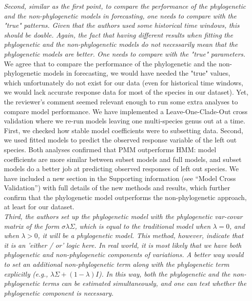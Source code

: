 \documentclass[11pt]{article}
\begin{document}
\emph{Second, similar as the first point, to compare the performance of the phylogenetic and the non-phylogenetic models in forecasting, one needs to compare with the "true" patterns. Given that the authors used some historical time windows, this should be doable. Again, the fact that having different results when fitting the phylogenetic and the non-phylogenetic models do not necessarily mean that the phylogenetic models are better. One needs to compare with the "true" parameters.}\\

We agree that to compare the performance of the phylogenetic and the non-phylogenetic models in forecasting, we would have needed the "true" values, which unfortunately do not exist for our data (even for historical time windows, we would lack accurate response data for most of the species in our dataset). Yet, the reviewer's comment seemed relevant enough to run some extra analyses to compare model performance. We have implemented a Leave-One-Clade-Out cross validation where we re-run models leaving one multi-species genus out at a time. First, we checked how stable model coefficients were to subsetting data. Second, we used fitted models to predict the observed response variable of the left out species. Both analyses confirmed that PMM outperforms HMM: model coefficients are more similar between subset models and full models, and subset models do a better job at predicting observed responses of left out species. We have included a new section in the Supporting information (see ``Model Cross Validation'') with full details of the new methods and results, which further confirm that the phylogenetic model outperforms the non-phylogenetic approach, at least for our dataset.\\


\emph{Third, the authors set up the phylogenetic model with the phylogenetic var-covar matrix of the form $\sigma\lambda\Sigma$, which is equal to the traditional model when $\lambda=0$, and when $\lambda>0$, it will be a phylogenetic model. This method, however, indicate that it is an 'either / or' logic here. In real world, it is most likely that we have both phylogenetic and non-phylogenetic components of variations. A better way would to set an additional non-phylogenetic term along with the phylogenetic term explicitly (e.g., $\lambda \Sigma + (1-\lambda)I$). In this way, both the phylogenetic and the non-phylogenetic terms can be estimated simultaneously, and one can test whether the phylogenetic component is necessary.}\\
\end{document}
